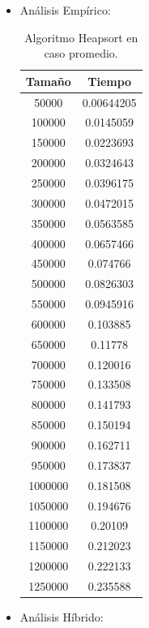\documentclass[a4paper,12pt,twoside]{article} %
\begin{document}
	\begin{itemize}
		\item Análisis Empírico:
		
\begin{table}[h]
	\begin{center}
		\begin{tabular}{|c|c|}
		\hline
		Tamaño & Tiempo \\
		\hline
		50000 & 0.00644205 \\
		100000 & 0.0145059 \\
		150000 & 0.0223693 \\
		200000 & 0.0324643 \\
		250000 & 0.0396175 \\
		300000 & 0.0472015 \\
		350000 & 0.0563585 \\
		400000 & 0.0657466 \\
		450000 & 0.074766 \\
		500000 & 0.0826303 \\
		550000 & 0.0945916 \\
		600000 & 0.103885 \\
		650000 & 0.11778 \\
		700000 & 0.120016 \\
		750000 & 0.133508 \\
		800000 & 0.141793 \\
		850000 & 0.150194 \\
		900000 & 0.162711 \\
		950000 & 0.173837 \\
		1000000 & 0.181508 \\
		1050000 & 0.194676 \\
		1100000 & 0.20109 \\
		1150000 & 0.212023 \\
		1200000 & 0.222133 \\
		1250000 & 0.235588 \\
		\hline
		\end{tabular}
	\end{center}
	\caption{Algoritmo Heapsort en caso promedio.}
\end{table}
\newpage
		
		\item Análisis Híbrido:
		
\begin{figure}[h]
  \begin{center}
  

\end{center}
\end{figure}
\end{itemize}
\end{document}
